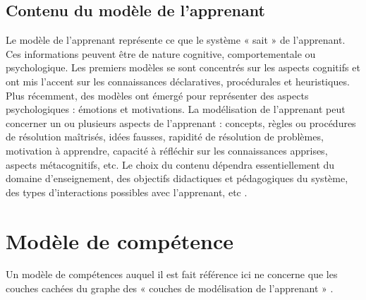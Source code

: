 \subsection{Contenu du modèle de l'apprenant}
Le modèle de l'apprenant représente ce que le système « sait » de l'apprenant. Ces informations peuvent être de nature cognitive, comportementale ou psychologique. Les premiers modèles se sont concentrés sur les aspects cognitifs et ont mis l'accent sur les connaissances déclaratives, procédurales et heuristiques.
Plus récemment, des modèles ont émergé pour représenter des aspects psychologiques : émotions et motivations.
La modélisation de l'apprenant peut concerner un ou plusieurs aspects de l'apprenant : concepts, règles ou procédures de résolution maîtrisés, idées fausses, rapidité de résolution de problèmes, motivation à apprendre, capacité à réfléchir sur les connaissances apprises, aspects métacognitifs, etc.
Le choix du contenu dépendra essentiellement du domaine d'enseignement, des objectifs didactiques et pédagogiques du système, des types d'interactions possibles avec l'apprenant, etc \cite{gestionnaire_modele_apprenant}.


\section{Modèle de compétence}
Un modèle de compétences auquel il est fait référence ici ne concerne que les couches cachées du graphe des « couches de modélisation de l'apprenant » \cite{log_Files_to_Assessment_Metrics}.

